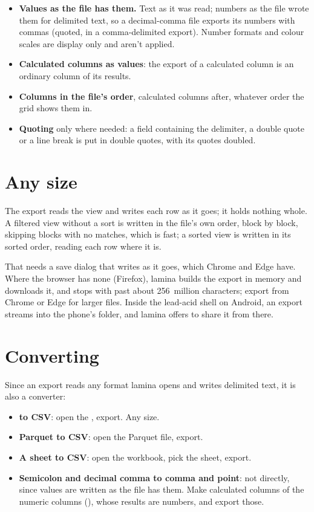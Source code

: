 \begin{itemize}
\item \textbf{Values as the file has them.} Text as it was read; numbers as the file wrote them for
delimited text, so a decimal-comma file exports its numbers with commas (quoted, in a comma-delimited
export). Number formats and colour scales are display only and aren't applied.
\item \textbf{Calculated columns as values}: the export of a calculated column is an ordinary column of
its results.
\item \textbf{Columns in the file's order}, calculated columns after, whatever order the grid shows them
in.
\item \textbf{Quoting} only where needed: a field containing the delimiter, a double quote or a line
break is put in double quotes, with its quotes doubled.
\end{itemize}

\section{Any size}\label{sec:export-size}

The export reads the view and writes each row as it goes; it holds nothing whole. A filtered view without
a sort is written in the file's own order, block by block, skipping blocks with no matches, which is fast;
a sorted view is written in its sorted order, reading each row where it is.

That needs a save dialog that writes as it goes, which Chrome and Edge have. Where the browser has none
(Firefox), lamina builds the export in memory and downloads it, and stops with  past about 256~million characters; export from Chrome or Edge for larger files. Inside
the lead-acid shell on Android, an export streams into the phone's  folder, and lamina
offers to share it from there.

\section{Converting}\label{sec:convert}

Since an export reads any format lamina opens and writes delimited text, it is also a converter:

\begin{itemize}
\item \textbf{ to CSV}: open the , export. Any size.
\item \textbf{Parquet to CSV}: open the Parquet file, export.
\item \textbf{A sheet to CSV}: open the workbook, pick the sheet, export.
\item \textbf{Semicolon and decimal comma to comma and point}: not directly, since values are written as
the file has them. Make calculated columns of the numeric columns (), whose results are
numbers, and export those.
\end{itemize}

